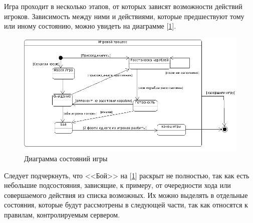 Игра проходит в несколько этапов, от которых зависят возможности действий игроков. Зависимость между ними и действиями, которые предшествуют тому или иному состоянию, можно увидеть на диаграмме [\ref{fig12}].

\begin{figure}[ht]
\centering
\includegraphics[width=18cm]{images/statecl.png}
\caption{Диаграмма состояний игры}
\label{fig12}
\end{figure}


Следует подчеркнуть, что <<Бой>> на [\ref{fig12}] раскрыт не полностью, так как есть небольшие подсостояния, зависящие, к примеру, от очередности хода или совершаемого действия из списка возможных. Их можно выделять в отдельные состояния, которые будут рассмотрены в следующей части, так как относятся к правилам, контролируемым сервером. 
\endinput

